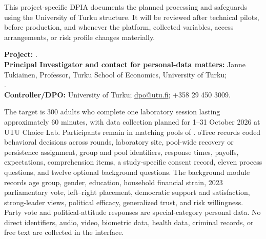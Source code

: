 


\begin{reviewbox}
This project-specific DPIA documents the planned processing and safeguards using the University of Turku structure.  It will be reviewed after technical pilots, before production, and whenever the platform, collected variables, access arrangements, or risk profile changes materially.
\end{reviewbox}

\textbf{Project:} \StudyTitle.\\
\textbf{Principal Investigator and contact for personal-data matters:} Janne Tukiainen, Professor, Turku School of Economics, University of Turku;\\
\StudyEmail.\\
\textbf{Controller/DPO:} University of Turku; \href{mailto:dpo@utu.fi}{dpo@utu.fi}; +358 29 450 3009.\\

The target is 300 adults who complete one laboratory session lasting approximately 60 minutes, with data collection planned for 1--31 October 2026 at UTU Choice Lab. Participants remain in matching pools of . oTree records coded behavioral decisions across  rounds, laboratory site, pool-wide recovery or persistence assignment, group and pool identifiers, response times, payoffs, expectations, comprehension items, a study-specific consent record, eleven process questions, and twelve optional background questions. The background module records age group, gender, education, household financial strain, 2023 parliamentary vote, left--right placement, democratic support and satisfaction, strong-leader views, political efficacy, generalized trust, and risk willingness. Party vote and political-attitude responses are special-category personal data. No direct identifiers, audio, video, biometric data, health data, criminal records, or free text are collected in the interface.

